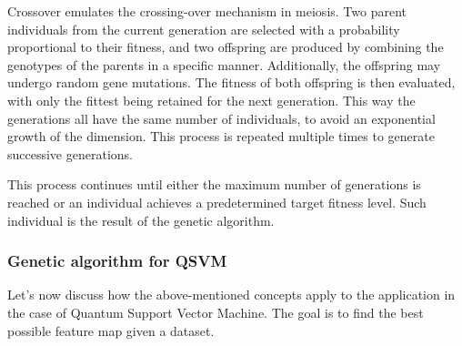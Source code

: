 \documentclass[12pt]{article}
\begin{document}
Crossover emulates the crossing-over mechanism in meiosis. Two parent individuals from the current generation are selected with a probability proportional to their fitness, and two offspring are produced by combining the genotypes of the parents in a specific manner. Additionally, the offspring may undergo random gene mutations. The fitness of both offspring is then evaluated, with only the fittest being retained for the next generation. This way the generations all have the same number of individuals, to avoid an exponential growth of the dimension. This process is repeated multiple times to generate successive generations.

This process continues until either the maximum number of generations is reached or an individual achieves a predetermined target fitness level. Such individual is the result of the genetic algorithm. 

\subsubsection{Genetic algorithm for QSVM}
Let's now discuss how the above-mentioned concepts apply to the application in the case of Quantum Support Vector Machine. The goal is to find the best possible feature map given a dataset. 
\end{document}
